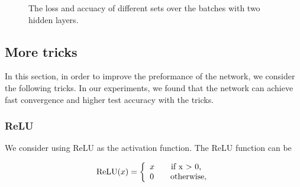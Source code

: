 \documentclass{article} %
\begin{document}
\begin{figure} [!htbp]
	
	\caption{The loss and accuacy of different sets over the batches with two hidden layers. }  

\end{figure}



\subsection{More tricks}
In this section, in order to improve the preformance of the network, we consider the following tricks. In our experiments, we found that the network can achieve fast convergence and higher test accuracy with the tricks.

\subsubsection{ReLU}
We consider using ReLU as the activation function. The ReLU function can be 

\[
\textnormal{ReLU}(x) =\left\{
\begin{array}{ll}
x \qquad \textnormal{if x $>$ 0,}\\
0 \qquad \textnormal{otherwise,}
\end{array}
\right.
\]
\end{document}
